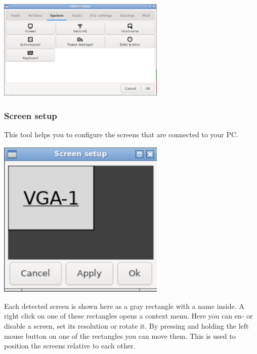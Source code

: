 \documentclass[a4paper,12pt,twoside]{article}
\begin{document}
\bigskip
\begin{minipage}{\linewidth}
    \centering
    \captionsetup{type=figure}
    \includegraphics[width=8cm]{screenshots/efalive_setup_system.png}
    \label{fig:efalivesetup_system}
\end{minipage}
\bigskip

\subsubsection{Screen setup}
\label{sct:screen_setup}
This tool helps you to configure the screens that are connected to your
PC.

\bigskip
\begin{minipage}{\linewidth}
    \centering
    \captionsetup{type=figure}
    \includegraphics[width=8cm]{screenshots/efalive_setup_screen_dialog.png}
    \label{fig:screen_setup}
\end{minipage}
\bigskip

Each detected screen is shown here as a gray rectangle with a name
inside. A right click on one of these rectangles opens a context menu.
Here you can en- or disable a screen, set its resolution or rotate it.
By pressing and holding the left mouse button on one of the rectangles
you can move them. This is used to position the screens relative to
each other.
\end{document}
